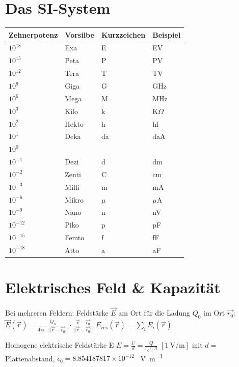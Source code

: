 \documentclass{article}
\begin{document}
	\twocolumn
	\section{Das SI-System}
	
	\begin{tabular}{|l|l|l|l|}
		\hline\tiny
		\textbf{Zehnerpotenz} & \textbf{Vorsilbe} & \textbf{Kurzzeichen} & \textbf{Beispiel} \\
		\hline
		$10^{18}$ & Exa & E & EV \\
		$10^{15}$ & Peta & P & PV \\
		$10^{12}$ & Tera & T & TV \\
		$10^{9}$ & Giga & G & GHz \\
		$10^{6}$ & Mega & M & MHz \\
		$10^{3}$ & Kilo & k & K$\Omega$ \\
		$10^{2}$ & Hekto & h & hl \\
		$10^{1}$ & Deka & da & daA \\
		$10^{0}$ & & & \\
		$10^{-1}$ & Dezi & d & dm \\
		$10^{-2}$ & Zenti & C & cm \\
		$10^{-3}$ & Milli & m & mA \\
		$10^{-6}$ & Mikro & $\mu$ & $\mu$A \\
		$10^{-9}$ & Nano & n & nV \\
		$10^{-12}$ & Piko & p & pF \\
		$10^{-15}$ & Femto & f & fF \\
		$10^{-18}$ & Atto & a & aF \\
		\hline
	\end{tabular}
	
	\section{Elektrisches Feld \& Kapazität}
	
	Bei mehreren Feldern:
	Feldstärke $\vec{E}$ am Ort für die Ladung $Q_{0}$ im Ort $\vec{r_{0}}:$
	$\vec{E}(\vec{r})=\frac{Q_{0}}{4\pi\epsilon\cdot||\vec{r}-\vec{r_{0}}||}\cdot\frac{\vec{r}-\vec{r_{0}}}{||\vec{r}-\vec{r_{0}}||}$
	$E_{res}(\vec{r})=\sum_{i}E_{i}(\vec{r})$
	
	Homogene elektrische Feldstärke E
	$E=\frac{U}{d}=\frac{Q}{\epsilon_{0}\epsilon_{r}A}$ $\left[\SI{1}{\volt\per\meter}\right]$
	mit $d=$ Plattenabstand, $\epsilon_{0}=8.854187817 \times 10^{-12}$
	\SI{}{\volt\per\meter}
	
\end{document}

